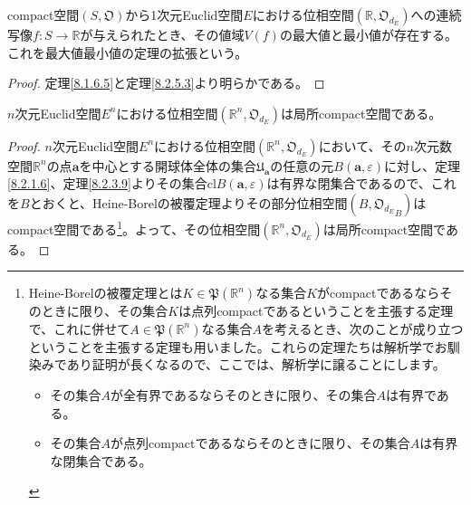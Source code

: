 \documentclass[dvipdfmx]{jsarticle}
\begin{document}
\begin{thm}[最大値最小値の定理の拡張]\label{8.2.5.4}
compact空間$\left( S,\mathfrak{O} \right)$から1次元Euclid空間$E$における位相空間$\left( \mathbb{R},\mathfrak{O}_{d_{E}} \right)$への連続写像$f:S \rightarrow \mathbb{R}$が与えられたとき、その値域$V(f)$の最大値と最小値が存在する。これを最大値最小値の定理の拡張という。
\end{thm}
\begin{proof} 定理\ref{8.1.6.5}と定理\ref{8.2.5.3}より明らかである。
\end{proof}
\begin{thm}\label{8.2.5.5}
$n$次元Euclid空間$E^{n}$における位相空間$\left( \mathbb{R}^{n},\mathfrak{O}_{d_{E}} \right)$は局所compact空間である。
\end{thm}
\begin{proof}
$n$次元Euclid空間$E^{n}$における位相空間$\left( \mathbb{R}^{n},\mathfrak{O}_{d_{E}} \right)$において、その$n$次元数空間$\mathbb{R}^{n}$の点$\mathbf{a}$を中心とする開球体全体の集合$\mathfrak{U}_{\mathbf{a}}$の任意の元$B\left( \mathbf{a},\varepsilon \right)$に対し、定理\ref{8.2.1.6}、定理\ref{8.2.3.9}よりその集合${\mathrm{cl}}{B\left( \mathbf{a},\varepsilon \right)}$は有界な閉集合であるので、これを$B$とおくと、Heine-Borelの被覆定理よりその部分位相空間$\left( B,{\mathfrak{O}_{d_{E}}}_{B} \right)$はcompact空間である\footnote{Heine-Borelの被覆定理とは$K \in \mathfrak{P}\left( \mathbb{R}^{n} \right)$なる集合$K$がcompactであるならそのときに限り、その集合$K$は点列compactであるということを主張する定理で、これに併せて$A \in \mathfrak{P}\left( \mathbb{R}^{n} \right)$なる集合$A$を考えるとき、次のことが成り立つということを主張する定理も用いました。これらの定理たちは解析学でお馴染みであり証明が長くなるので、ここでは、解析学に譲ることにします。
\begin{itemize}
\item 
  その集合$A$が全有界であるならそのときに限り、その集合$A$は有界である。
\item 
  その集合$A$が点列compactであるならそのときに限り、その集合$A$は有界な閉集合である。
\end{itemize}}。よって、その位相空間$\left( \mathbb{R}^{n},\mathfrak{O}_{d_{E}} \right)$は局所compact空間である。
\end{proof}
\end{document}
